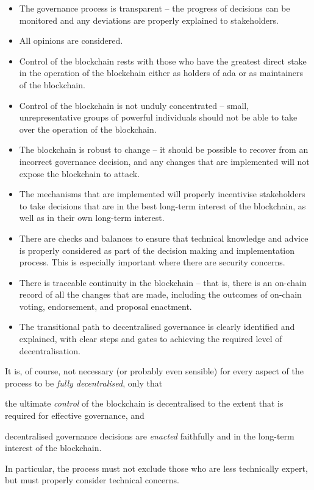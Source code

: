 \begin{itemize}
\item
  The governance process is transparent -- the progress of decisions can be monitored and any deviations are properly explained to stakeholders.
\item
  All opinions are considered.
\item
  Control of the blockchain rests with those who have the greatest direct stake in the operation of the blockchain either as holders of ada or as maintainers of the blockchain.
\item
  Control of the blockchain is not unduly concentrated -- small, unrepresentative groups of powerful individuals should not be able to take over the operation
  of the blockchain.
\item
  The blockchain is robust to change -- it should be possible to recover from an incorrect governance decision, and any changes that are implemented will not expose the blockchain to attack.
\item
  The mechanisms that are implemented will properly incentivise stakeholders to take decisions that are in the best long-term interest of the blockchain, as well as in their own long-term interest.
\item
  There are checks and balances to ensure that technical knowledge and advice is properly considered as part of the decision making and implementation process.
  This is especially important where there are security concerns.
\item
  There is traceable continuity in the blockchain -- that is, there is an on-chain record of all the changes that are made, including the outcomes of on-chain voting, endorsement, and proposal enactment.
\item
  The transitional path to decentralised governance is clearly identified and explained, with clear steps and gates to achieving the required level of decentralisation.
\end{itemize}


It is, of course, not necessary (or probably even sensible) for every aspect of
the process to be \emph{fully decentralised}, only that
\begin{inparaenum}
\item
  the ultimate \emph{control} of
the blockchain is decentralised to the extent that is required for effective
governance, and
\item
  decentralised governance decisions are \emph{enacted} faithfully and in the
  long-term interest of the blockchain.
\end{inparaenum}
In particular, the process must not exclude those who
are less technically expert, but must properly consider technical concerns.

